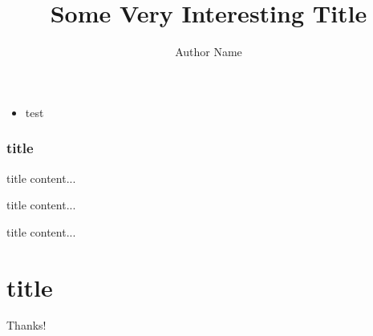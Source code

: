 \documentclass[
  aspectratio=169,
  xcolor=dvipsnames
]{beamer}
\title{Some Very Interesting Title}
\author{Author Name}
\institute{Cool Conference}
\begin{document}
\maketitle

\begin{frame}

\begin{itemize}
\item test
\end{itemize}
\frametitle{title}
  \begin{block}{title}
  content...
  \end{block}
  \begin{alertblock}{title}
  content...
  \end{alertblock}
  \begin{exampleblock}{title}
  content...
  \end{exampleblock}    
\end{frame}

\section{title}

\begin{frame}[standout]
Thanks!
\end{frame}
\end{document}
